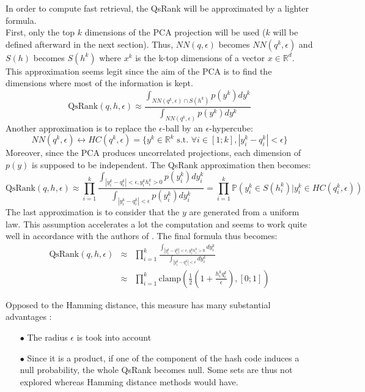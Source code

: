 \documentclass{article}
\newcommand{\RR}{\mathbb{R}}
\newcommand{\qr}{\textrm{QsRank}}
\begin{document}
In order to compute fast retrieval, the QsRank will be approximated by a lighter formula.\\
First, only the top $k$ dimensions of the PCA projection will be used ($k$ will be defined afterward in the next section). Thus, $NN(q,\epsilon)$ becomes $NN(q^k,\epsilon)$ and $S(h)$ becomes $S(h^k)$ where $x^k$ is the k-top dimensions of a vector $x \in \RR^d$. This approximation seems legit since the aim of the PCA is to find the dimensions where most of the information is kept.
\[
	\qr(q, h, \epsilon) \approx \frac{\int_{NN(q^k,\epsilon) \cap S(h^k)} p(y^k) dy^k}{\int_{NN(q^k,\epsilon)} p(y^k) dy^k}
\]
Another approximation is to replace the $\epsilon$-ball by an $\epsilon$-hypercube:
\[
	NN(q^k,\epsilon) \leftrightarrow HC(q^k,\epsilon) = \{y^k \in \RR^k \text{ s.t. } \forall i \in [1;k], |y^k_i-q^k_i|<\epsilon\}
\]
Moreover, since the PCA produces uncorrelated projections, each dimension of $p(y)$ is supposed to be independent. The QsRank approximation then becomes:
\[
	\qr(q, h, \epsilon) \approx \prod_{i=1}^k \frac{\int_{|y^k_i - q^k_i| < \epsilon, y^k_i h^k_i > 0 } p(y^k_i) dy^k_i}{\int_{|y^k_i - q^k_i| < \epsilon} p(y^k_i) dy^k_i} = \prod_{i=1}^k \mathbb{P}(y^k_i \in S(h^k_i) | y^k_i \in HC(q^k_i,\epsilon))
\]
The last approximation is to consider that the $y$ are generated from a uniform law. This assumption accelerates a lot the computation and seems to work quite well in accordance with the authors of \citep{QSRank}. The final formula thus becomes:
\begin{eqnarray*}
	\qr(q, h, \epsilon) 
	& \approx & \prod_{i=1}^k \frac{\int_{|y^k_i - q^k_i| < \epsilon, y^k_i h^k_i > 0 } dy^k_i}{\int_{|y^k_i - q^k_i| < \epsilon} dy^k_i} \\
	& \approx & \prod_{i=1}^k \text{clamp} \left(\frac{1}{2}\left( 1 + \frac{h^k_i q^k_i}{\epsilon} \right), [0;1] \right)                  
\end{eqnarray*}

Opposed to the Hamming distance, this measure has many substantial advantages :
\begin{enumerate}
	\item[$\bullet$] The radius $\epsilon$ is took into account	
	\item[$\bullet$] Since it is a product, if one of the component of the hash code induces a null probability, the whole QsRank becomes null. Some sets are thus not explored whereas Hamming distance methods would have.
\end{enumerate}
\end{document}
